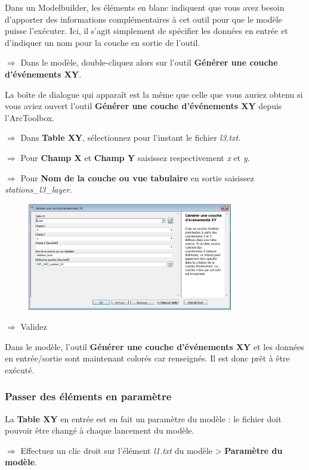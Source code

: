 \documentclass[11pt]{article}
\newcommand{\action}{$\Rightarrow$ }
\begin{document}
Dans un Modelbuilder, les éléments en blanc indiquent que vous avez besoin d'apporter des informations complémentaires à cet outil pour que le modèle puisse l'exécuter. Ici, il s'agit simplement de spécifier les données en entrée et d'indiquer un nom pour la couche en sortie de l'outil.

\action Dans le modèle, double-cliquez alors sur l'outil \textbf{Générer une couche d'événements XY}.

La boîte de dialogue qui apparaît est la même que celle que vous auriez obtenu si vous aviez ouvert l'outil \textbf{Générer une couche d'événements XY} depuis l'ArcToolbox.

\action Dans \textbf{Table XY}, sélectionnez pour l'instant le fichier \textit{l3.txt}.

\action Pour \textbf{Champ X} et \textbf{Champ Y} saisissez respectivement \textit{x} et \textit{y}.

\action Pour \textbf{Nom de la couche ou vue tabulaire} en sortie saisissez \textit{stations\_l3\_layer}.
\begin{figure}[H]
	\center \includegraphics[width=0.8\textwidth]{img/td3/modelbuilder_creation-2.png}\\
\end{figure}

\action Validez

Dans le modèle, l'outil \textbf{Générer une couche d'événements XY} et les données en entrée/sortie sont maintenant colorés car renseignés. Il est donc prêt à être exécuté.


\subsubsection{Passer des éléments en paramètre}
La \textbf{Table XY} en entrée est en fait un paramètre du modèle : le fichier doit pouvoir être changé à chaque lancement du modèle.

\action Effectuez un clic droit sur l'élément \textit{l1.txt} du modèle > \textbf{Paramètre du modèle}.
\end{document}
